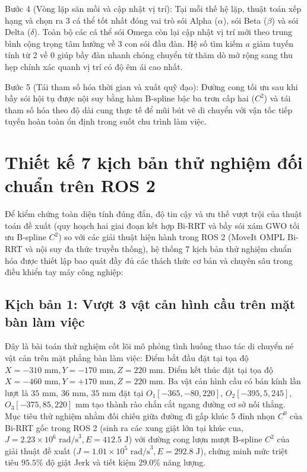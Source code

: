 Bước 4 (Vòng lặp săn mồi và cập nhật vị trí): Tại mỗi thế hệ lặp, thuật toán xếp hạng và chọn ra 3 cá thể tốt nhất đóng vai trò sói Alpha ($\alpha$), sói Beta ($\beta$) và sói Delta ($\delta$). Toàn bộ các cá thể sói Omega còn lại cập nhật vị trí mới theo trung bình cộng trọng tâm hướng về 3 con sói đầu đàn. Hệ số tìm kiếm $a$ giảm tuyến tính từ 2 về 0 giúp bầy đàn nhanh chóng chuyển từ thăm dò mở rộng sang thu hẹp chính xác quanh vị trí có độ êm ái cao nhất.

Bước 5 (Tái tham số hóa thời gian và xuất quỹ đạo): Đường cong tối ưu sau khi bầy sói hội tụ được nội suy bằng hàm B-spline bậc ba trơn cấp hai ($C^2$) và tái tham số hóa theo độ dài cung thực tế để mũi bút vẽ di chuyển với vận tốc tiếp tuyến hoàn toàn ổn định trong suốt chu trình làm việc.

\section{Thiết kế 7 kịch bản thử nghiệm đối chuẩn trên ROS 2}
\label{sec:test_scenarios_design}

Để kiểm chứng toàn diện tính đúng đắn, độ tin cậy và ưu thế vượt trội của thuật toán đề xuất (quy hoạch hai giai đoạn kết hợp Bi-RRT và bầy sói xám GWO tối ưu B-spline $C^2$) so với các giải thuật hiện hành trong ROS 2 (MoveIt OMPL Bi-RRT và nội suy đa thức truyền thống), hệ thống 7 kịch bản thử nghiệm chuẩn hóa được thiết lập bao quát đầy đủ các thách thức cơ bản và chuyên sâu trong điều khiển tay máy công nghiệp:

\subsection{Kịch bản 1: Vượt 3 vật cản hình cầu trên mặt bàn làm việc}

Đây là bài toán thử nghiệm cốt lõi mô phỏng tình huống thao tác di chuyển né vật cản trên mặt phẳng bàn làm việc:
Điểm bắt đầu đặt tại tọa độ $X = -310\text{ mm}, Y = -170\text{ mm}, Z = 220\text{ mm}$.
Điểm kết thúc đặt tại tọa độ $X = -460\text{ mm}, Y = +170\text{ mm}, Z = 220\text{ mm}$.
Ba vật cản hình cầu có bán kính lần lượt là $35\text{ mm}$, $36\text{ mm}$, $35\text{ mm}$ đặt tại $O_1[-365, -80, 220]$, $O_2[-395, 5, 245]$, $O_3[-375, 85, 220]\text{ mm}$ tạo thành rào chắn cắt ngang đường cơ sở nối thẳng.
Mục tiêu thử nghiệm nhằm đối chiếu giữa đường đi gấp khúc 5 đỉnh nhọn $C^0$ của Bi-RRT gốc trong ROS 2 (sinh ra các xung giật lớn tại khúc cua, $J = 2.23 \times 10^6\text{ rad/s}^3, E = 412.5\text{ J}$) với đường cong lượn mượt B-spline $C^2$ của giải thuật đề xuất ($J = 1.01 \times 10^5\text{ rad/s}^3, E = 292.8\text{ J}$), chứng minh mức triệt tiêu $95.5\%$ độ giật Jerk và tiết kiệm $29.0\%$ năng lượng.

